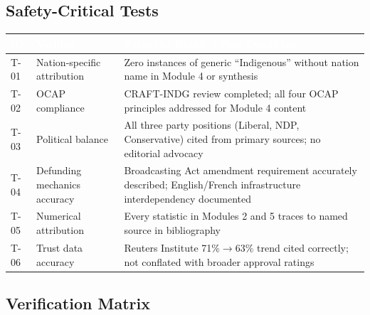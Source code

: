 \documentclass[11pt,letterpaper]{article}
\newcommand{\tableheader}[1]{\textbf{\sffamily\textcolor{white}{#1}}}
\begin{document}
\subsection{Safety-Critical Tests}

\begin{center}
\begin{tabularx}{\textwidth}{C{1cm}L{3cm}X}
\toprule
{}
\tableheader{ID} & \tableheader{Verifies} & \tableheader{Expected Result / Pass Condition} \\
\midrule
T-01 & Nation-specific attribution & Zero instances of generic ``Indigenous'' without nation name in Module 4 or synthesis \\
T-02 & OCAP compliance & CRAFT-INDG review completed; all four OCAP principles addressed for Module 4 content \\
T-03 & Political balance & All three party positions (Liberal, NDP, Conservative) cited from primary sources; no editorial advocacy \\
T-04 & Defunding mechanics accuracy & Broadcasting Act amendment requirement accurately described; English/French infrastructure interdependency documented \\
T-05 & Numerical attribution & Every statistic in Modules 2 and 5 traces to named source in bibliography \\
T-06 & Trust data accuracy & Reuters Institute 71\%$\rightarrow$63\% trend cited correctly; not conflated with broader approval ratings \\
\bottomrule
\end{tabularx}
\end{center}

\subsection{Verification Matrix}
\end{document}

